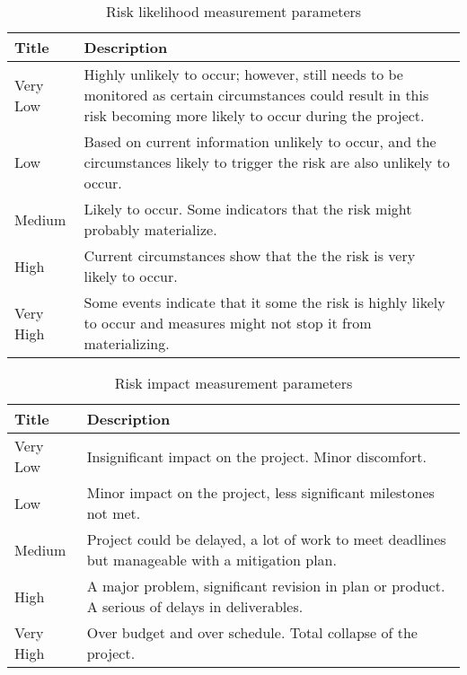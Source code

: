 \begin{center}
    \begin{table}[htb]
    \begin{tabular}{ | l | p{10cm} |}

    \hline
    Title & Description  \\ \hline \hline
    Very Low & Highly unlikely to occur; however, still needs to be monitored as certain circumstances could result
    in this risk becoming more likely to occur during the project. \\ \hline
    Low & Based on current information unlikely to occur, and the circumstances likely to trigger the risk are also unlikely to occur. \\ \hline
    Medium & Likely to occur. Some indicators that the risk might probably materialize.  \\ \hline
    High & Current circumstances show that the the risk is very likely to occur. \\ \hline
    Very High & Some events indicate that it some the risk is highly likely to occur and measures might not stop it from materializing.\\ \hline
    \end{tabular}
    \caption{Risk likelihood measurement parameters}
    \label{tab:risk-likelihood}
    \end{table}
    
    \begin{table}[htb]
    \begin{tabular}{|l|p{10cm}|}
    \hline
    Title & Description \\ \hline \hline
    Very Low & Insignificant impact on the project. Minor discomfort. \\ \hline
    Low & Minor impact on the project, less significant milestones not met. \\ \hline
    Medium & Project could be delayed, a lot of work to meet deadlines but manageable with a mitigation plan. \\ \hline
    High & A major problem, significant revision in plan or product. A serious of delays in deliverables.\\ \hline
    Very High & Over budget and over schedule. Total collapse of the project. \\ \hline
    \end{tabular}
    \caption{Risk impact measurement parameters}
    \label{tab:risk-impact}
    \end{table}
\end{center}
